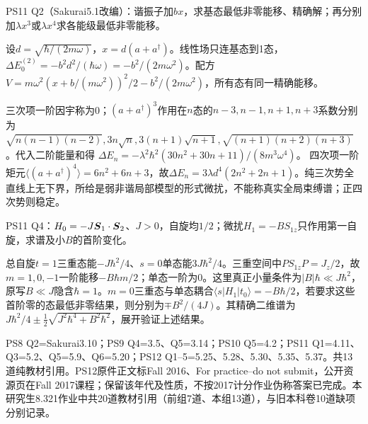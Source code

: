 \begin{exercise}
PS11 Q2（Sakurai5.1改编）：谐振子加$bx$，求基态最低非零能移、精确解；再分别加$\lambda x^3$或$\lambda x^4$求各能级最低非零能移。
\end{exercise}
\begin{solution}
设$d=\sqrt{\hbar/(2m\omega)}$，$x=d(a+a^\dagger)$。线性场只连基态到1态，$\Delta E_0^{(2)}=-b^2d^2/(\hbar\omega)=-b^2/(2m\omega^2)$。配方$V=m\omega^2(x+b/(m\omega^2))^2/2-b^2/(2m\omega^2)$，所有态有同一精确能移。

三次项一阶因宇称为0；$(a+a^\dagger)^3$作用在$n$态的$n-3,n-1,n+1,n+3$系数分别为$\sqrt{n(n-1)(n-2)},3n\sqrt n,3(n+1)\sqrt{n+1},\sqrt{(n+1)(n+2)(n+3)}$。代入二阶能量和得
$\Delta E_n=-\lambda^2\hbar^2(30n^2+30n+11)/(8m^3\omega^4)$。
四次项一阶矩元$\langle(a+a^\dagger)^4\rangle=6n^2+6n+3$，故$\Delta E_n=3\lambda d^4(2n^2+2n+1)$。纯三次势全直线上无下界，所给是弱非谐局部模型的形式微扰，不能称真实全局束缚谱；正四次势则稳定。
\end{solution}
\begin{exercise}
PS11 Q4：$H_0=-J\boldsymbol{S}_1\cdot\boldsymbol{S}_2$、$J>0$，自旋均$1/2$；微扰$H_1=-BS_{1z}$只作用第一自旋，求谱及小$B$的首阶变化。
\end{exercise}
\begin{solution}
总自旋$t=1$三重态能$-J\hbar^2/4$、$s=0$单态能$3J\hbar^2/4$。三重空间中$PS_{1z}P=J_z/2$，故$m=1,0,-1$一阶能移$-B\hbar m/2$；单态一阶为0。这里真正小量条件为$|B|\hbar\ll J\hbar^2$，原写$B\ll J$隐含$\hbar=1$。$m=0$三重态与单态耦合$\langle s|H_1|t_0\rangle=-B\hbar/2$，若要求这些首阶零的态最低非零结果，则分别为$\mp B^2/(4J)$。其精确二维谱为$J\hbar^2/4\pm\frac12\sqrt{J^2\hbar^4+B^2\hbar^2}$，展开验证上述结果。
\end{solution}

PS8 Q2=Sakurai3.10；PS9 Q4=3.5、Q5=3.14；PS10 Q5=4.2；PS11 Q1=4.11、Q3=5.2、Q5=5.9、Q6=5.20；PS12 Q1--5=5.25、5.28、5.30、5.35、5.37。共13道纯教材引用。PS12原件正文标Fall 2016、For practice--do not submit，公开资源页在Fall 2017课程；保留该年代及性质，不按2017计分作业伪称答案已完成。本研究生8.321作业中共20道教材引用（前组7道、本组13道），与旧本科卷10道缺项分别记录。
